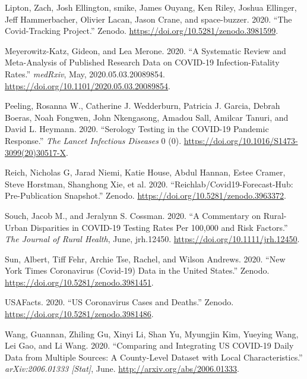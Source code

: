 \documentclass[
]{article}
\newlength{\cslhangindent}
\newenvironment{cslreferences}%
  {\setlength{\parindent}{0pt}%
  \everypar{\setlength{\hangindent}{\cslhangindent}}\ignorespaces}%
  {\par}
\begin{document}
\begin{cslreferences}
\leavevmode\hypertarget{ref-zachliptonCovidTrackingProject2020}{}%
Lipton, Zach, Josh Ellington, smike, James Ouyang, Ken Riley, Joshua
Ellinger, Jeff Hammerbacher, Olivier Lacan, Jason Crane, and
space-buzzer. 2020. ``The Covid-Tracking Project.'' Zenodo.
\url{https://doi.org/10.5281/zenodo.3981599}.

\leavevmode\hypertarget{ref-meyerowitz-katzSystematicReviewMetaanalysis2020}{}%
Meyerowitz-Katz, Gideon, and Lea Merone. 2020. ``A Systematic Review and
Meta-Analysis of Published Research Data on COVID-19 Infection-Fatality
Rates.'' \emph{medRxiv}, May, 2020.05.03.20089854.
\url{https://doi.org/10.1101/2020.05.03.20089854}.

\leavevmode\hypertarget{ref-peelingSerologyTestingCOVID192020}{}%
Peeling, Rosanna W., Catherine J. Wedderburn, Patricia J. Garcia, Debrah
Boeras, Noah Fongwen, John Nkengasong, Amadou Sall, Amilcar Tanuri, and
David L. Heymann. 2020. ``Serology Testing in the COVID-19 Pandemic
Response.'' \emph{The Lancet Infectious Diseases} 0 (0).
\url{https://doi.org/10.1016/S1473-3099(20)30517-X}.

\leavevmode\hypertarget{ref-nicholasgreichReichlabCovid19forecasthubPrepublication2020}{}%
Reich, Nicholas G, Jarad Niemi, Katie House, Abdul Hannan, Estee Cramer,
Steve Horstman, Shanghong Xie, et al. 2020.
``Reichlab/Covid19-Forecast-Hub: Pre-Publication Snapshot.'' Zenodo.
\url{https://doi.org/10.5281/zenodo.3963372}.

\leavevmode\hypertarget{ref-souchCommentaryRuralUrban2020}{}%
Souch, Jacob M., and Jeralynn S. Cossman. 2020. ``A Commentary on
Rural-Urban Disparities in COVID-19 Testing Rates Per 100,000 and Risk
Factors.'' \emph{The Journal of Rural Health}, June, jrh.12450.
\url{https://doi.org/10.1111/jrh.12450}.

\leavevmode\hypertarget{ref-albertsunNewYorkTimes2020}{}%
Sun, Albert, Tiff Fehr, Archie Tse, Rachel, and Wilson Andrews. 2020.
``New York Times Coronavirus (Covid-19) Data in the United States.''
Zenodo. \url{https://doi.org/10.5281/zenodo.3981451}.

\leavevmode\hypertarget{ref-usafactsUSCoronavirusCases2020}{}%
USAFacts. 2020. ``US Coronavirus Cases and Deaths.'' Zenodo.
\url{https://doi.org/10.5281/zenodo.3981486}.

\leavevmode\hypertarget{ref-wangComparingIntegratingUS2020}{}%
Wang, Guannan, Zhiling Gu, Xinyi Li, Shan Yu, Myungjin Kim, Yueying
Wang, Lei Gao, and Li Wang. 2020. ``Comparing and Integrating US
COVID-19 Daily Data from Multiple Sources: A County-Level Dataset with
Local Characteristics.'' \emph{arXiv:2006.01333 {[}Stat{]}}, June.
\url{http://arxiv.org/abs/2006.01333}.


\end{cslreferences}
\end{document}
